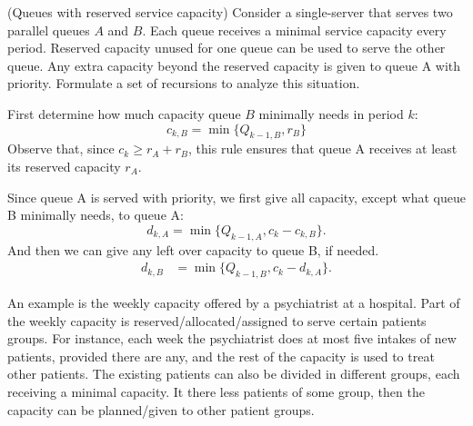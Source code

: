 \begin{exercise} 
  (Queues with reserved service capacity) Consider a single-server that
  serves two parallel queues $A$ and $B$. Each queue receives a minimal service
  capacity every period. Reserved capacity unused for one queue can be
  used to serve the other queue. Any extra capacity beyond the
  reserved capacity is given to queue A with priority. Formulate a set
  of recursions to analyze this situation.
  \begin{solution}
    First determine how much capacity queue $B$ minimally needs in
    period $k$:
    \begin{equation*}
      c_{k,B} = \min\{Q_{ k-1, B}, r_B\}
    \end{equation*}
    Observe that, since $c_k \geq r_A + r_B$, this rule ensures that
    queue A receives at least its reserved capacity $r_A$. 

    Since queue A is served with priority, we first give all capacity,
    except what queue B minimally needs, to queue A:
    \begin{equation*}
d_{k,A} = \min\{Q_{k-1, A}, c_k-c_{k,B}\}.
\end{equation*}
And then we can give any left over capacity to queue B, if needed. 
\begin{align*}
d_{k,B} &= \min\{Q_{k-1, B}, c_k-d_{k,A}\}.
\end{align*}

    An example is the weekly capacity offered by a psychiatrist at a
    hospital. Part of the weekly capacity is
    reserved/allocated/assigned to serve certain patients groups. For
    instance, each week the psychiatrist does at most five intakes of
    new patients, provided there are any, and the rest of the capacity
    is used to treat other patients. The existing patients can also be
    divided in different groups, each receiving a minimal capacity. It
    there less patients of some group, then the capacity can be
    planned/given to other patient groups. 
  \end{solution}
\end{exercise}


